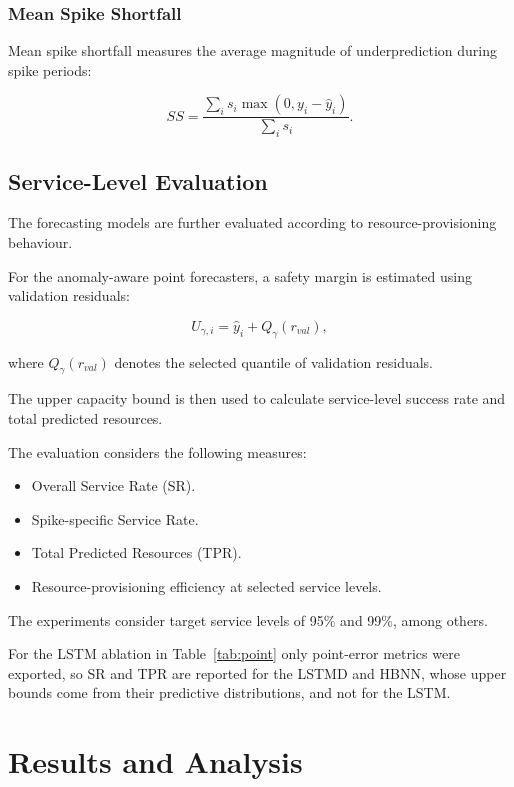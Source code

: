 \documentclass[conference]{IEEEtran}
\begin{document}
\subsubsection{Mean Spike Shortfall}

Mean spike shortfall measures the average magnitude of underprediction during spike periods:

\begin{equation}
SS=
\frac{\sum_i s_i\max(0,y_i-\hat{y}_i)}
{\sum_i s_i}.
\end{equation}

\subsection{Service-Level Evaluation}

The forecasting models are further evaluated according to resource-provisioning behaviour.

For the anomaly-aware point forecasters, a safety margin is estimated using validation residuals:

\begin{equation}
U_{\gamma,i}=\hat{y}_i+Q_{\gamma}(r_{val}),
\end{equation}

where $Q_{\gamma}(r_{val})$ denotes the selected quantile of validation residuals.

The upper capacity bound is then used to calculate service-level success rate and total predicted resources.

The evaluation considers the following measures:

\begin{itemize}
\item Overall Service Rate (SR).
\item Spike-specific Service Rate.
\item Total Predicted Resources (TPR).
\item Resource-provisioning efficiency at selected service levels.
\end{itemize}

The experiments consider target service levels of 95\% and 99\%, among others.

For the LSTM ablation in Table~\ref{tab:point} only point-error metrics were exported, so SR and TPR are reported for the LSTMD and HBNN, whose upper bounds come from their predictive distributions, and not for the LSTM.

\section{Results and Analysis}
\end{document}
